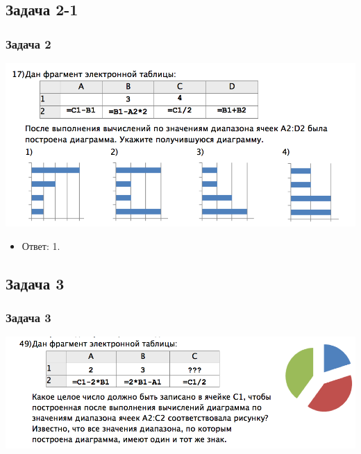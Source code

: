 \documentclass[compress,red]{beamer}
\begin{document}
\subsection{Задача 2-1}
\begin{frame}[fragile]
  \frametitle{Задача 2}
  \centerline{\includegraphics[width=1.0\textwidth]{images/08.png}}
  \begin{itemize}
      \item Ответ: 1.
  \end{itemize}
\end{frame}

\subsection{Задача 3}
\begin{frame}[fragile]
  \frametitle{Задача 3}
  \centerline{\includegraphics[width=1.0\textwidth]{images/09.png}}
\end{frame}
\end{document}
